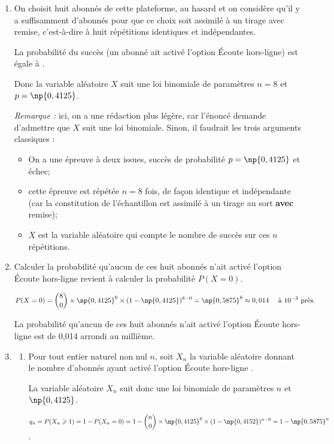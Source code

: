 \begin{enumerate}
\item On choisit huit abonnés de cette plateforme, au hasard et on considère qu'il y a suffisamment d'abonnés pour que ce choix soit assimilé à un tirage avec remise, c'est-à-dire à huit répétitions identiques et indépendantes.

La probabilité du succès (un abonné ait activé l'option \og Écoute hors-ligne\fg{}) est égale à .

Donc la variable aléatoire $X$ suit une loi binomiale de paramètres $n=8$ et $p= \np{0,4125}$.

\emph{Remarque :} ici, on a une rédaction plus légère, car l'énoncé demande d'admettre que $X$ suit une loi binomiale. Sinon, il faudrait les trois arguments classiques :

\begin{itemize}
\item On a une épreuve à deux issues, succès de probabilité $p = \np{0,4125}$ et échec;
\item cette épreuve est répétée $n = 8$ fois, de façon identique et indépendante (car la constitution de l'échantillon est assimilé à un tirage au sort \textbf{avec} remise);
\item $X$ est la variable aléatoire qui compte le nombre de succès sur ces $n$ répétitions.
\end{itemize}

\item Calculer la probabilité qu'aucun de ces huit abonnés n'ait activé l'option \og Écoute hors-ligne \fg{} revient à calculer la probabilité $P(X =0)$.

$\displaystyle P(X = 0)= \binom{8}{0} \times \np{0,4125}^0 \times (1 - \np{0,4125})^{8-0} = \np{0,5875}^8 \approx 0,014 \quad\text{ à } 10^{-3} \text{ près.}$

La probabilité qu'aucun de ces huit abonnés n'ait activé l'option \og Écoute hors-ligne \fg{} est de 0,014 arrondi au millième.

\item
	\begin{enumerate}
		\item Pour tout entier naturel non nul $n$, soit $X_n$ la variable aléatoire donnant le nombre d'abonnés ayant activé l'option \og Écoute hors-ligne \fg{}.

La variable aléatoire $X_n$ suit donc une loi binomiale de paramètres $n$ et $\np{0,4125}$.

$\displaystyle q_n = P(X_n \geqslant 1) = 1 - P (X_n=0) =1- \binom{n}{0} \times \np{0,4125}^0 \times (1- \np{0,4152})^{n-0}= 1- \np{0,5875}^n$.


\end{enumerate}
\end{enumerate}
